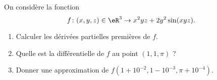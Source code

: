 
\begin{exercice}\label{exoOutilsMath-0124}

    On considère la fonction
    \begin{equation}
        f\colon (x,y,z)\in\eR^3\to x^2yz+2y^2\sin(xyz).
    \end{equation}
    \begin{enumerate}
        \item
            Calculer les dérivées partielles premières de \( f\).
        \item
            Quelle est la différentielle de \( f\) au point \( (1,1,\pi)\) ?
        \item
            Donner une approximation de \( f(1+10^{-2},1-10^{-3},\pi+10^{-4})\).
    \end{enumerate}
    

\end{exercice}
